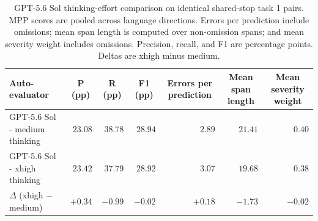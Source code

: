 \begin{table}[t]
\centering
\small
\begin{tabular}{lrrrrrr}
\toprule
Auto-evaluator & \multicolumn{1}{c}{P (pp)} & \multicolumn{1}{c}{R (pp)} & \multicolumn{1}{c}{F1 (pp)} & \multicolumn{1}{c}{Errors per prediction} & \multicolumn{1}{c}{Mean span length} & \multicolumn{1}{c}{Mean severity weight} \\
\midrule
GPT-5.6 Sol - medium thinking & $23.08$ & $38.78$ & $28.94$ & $2.89$ & $21.41$ & $0.40$ \\
GPT-5.6 Sol - xhigh thinking & $23.42$ & $37.79$ & $28.92$ & $3.07$ & $19.68$ & $0.38$ \\
$\Delta$ (xhigh $-$ medium) & $+0.34$ & $-0.99$ & $-0.02$ & $+0.18$ & $-1.73$ & $-0.02$ \\
\bottomrule
\end{tabular}
\caption{GPT-5.6 Sol thinking-effort comparison on identical shared-stop task 1 pairs. MPP scores are pooled across language directions. Errors per prediction include omissions; mean span length is computed over non-omission spans; and mean severity weight includes omissions. Precision, recall, and F1 are percentage points. Deltas are xhigh minus medium.}
\label{tab:task1-gpt-sol-stop}
\end{table}

